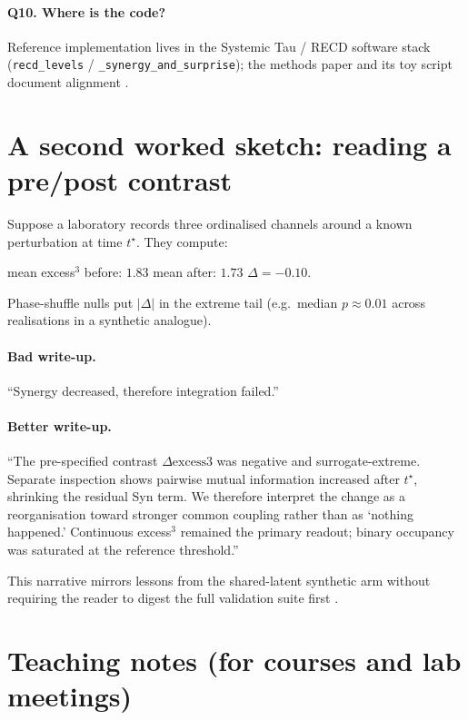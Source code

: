\documentclass[11pt,a4paper]{article}
\begin{document}
\paragraph{Q10. Where is the code?}
Reference implementation lives in the Systemic Tau / RECD software stack
(\texttt{recd\_levels} / \texttt{\_synergy\_and\_surprise}); the methods
paper and its toy script document alignment
\citep{Padilla2026excess3,Padilla2026software}.

\section{A second worked sketch: reading a pre/post contrast}
\label{sec:delta_story}

Suppose a laboratory records three ordinalised channels around a known
perturbation at time $t^\star$. They compute:
\begin{center}
mean excess$^3$ before: $1.83$ \qquad
mean after: $1.73$ \qquad
$\Delta=-0.10$.
\end{center}
Phase-shuffle nulls put $|\Delta|$ in the extreme tail (e.g.\ median
$p\approx 0.01$ across realisations in a synthetic analogue).

\paragraph{Bad write-up.}
``Synergy decreased, therefore integration failed.''

\paragraph{Better write-up.}
``The pre-specified contrast $\Delta\mathrm{excess3}$ was negative and
surrogate-extreme. Separate inspection shows pairwise mutual information
increased after $t^\star$, shrinking the residual Syn term. We therefore
interpret the change as a reorganisation toward stronger common coupling
rather than as `nothing happened.' Continuous excess$^3$ remained the
primary readout; binary occupancy was saturated at the reference
threshold.''

This narrative mirrors lessons from the shared-latent synthetic arm without
requiring the reader to digest the full validation suite first
\citep{Padilla2026excess3}.

\section{Teaching notes (for courses and lab meetings)}
\label{sec:teaching}
\end{document}
